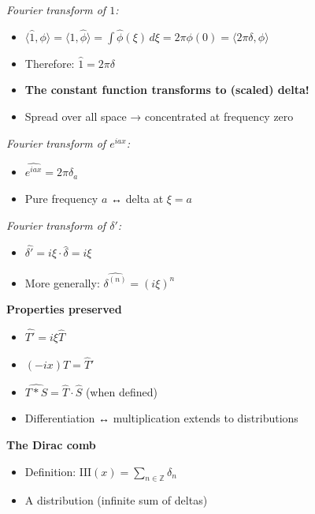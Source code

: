 \documentclass[
  10pt,
  letterpaper,
]{scrbook}
\providecommand{\tightlist}{%
  \setlength{\itemsep}{0pt}\setlength{\parskip}{0pt}}
\begin{document}
\emph{Fourier transform of \(1\):}

\begin{itemize}
\tightlist
\item
  \(\langle \hat{1}, \phi \rangle = \langle 1, \hat{\phi} \rangle = \int \hat{\phi}(\xi)\, d\xi = 2\pi \phi(0) = \langle 2\pi\delta, \phi \rangle\)
\item
  Therefore: \(\hat{1} = 2\pi\delta\)
\item
  \textbf{The constant function transforms to (scaled) delta!}
\item
  Spread over all space → concentrated at frequency zero
\end{itemize}

\emph{Fourier transform of \(e^{iax}\):}

\begin{itemize}
\tightlist
\item
  \(\widehat{e^{iax}} = 2\pi\delta_a\)
\item
  Pure frequency \(a\) ↔ delta at \(\xi = a\)
\end{itemize}

\emph{Fourier transform of \(\delta'\):}

\begin{itemize}
\tightlist
\item
  \(\widehat{\delta'} = i\xi \cdot \hat{\delta} = i\xi\)
\item
  More generally: \(\widehat{\delta^{(n)}} = (i\xi)^n\)
\end{itemize}

\textbf{Properties preserved}

\begin{itemize}
\tightlist
\item
  \(\widehat{T'} = i\xi \hat{T}\)
\item
  \(\widehat{(-ix)T} = \hat{T}'\)
\item
  \(\widehat{T * S} = \hat{T} \cdot \hat{S}\) (when defined)
\item
  Differentiation ↔ multiplication extends to distributions
\end{itemize}

\textbf{The Dirac comb}

\begin{itemize}
\tightlist
\item
  Definition: \(\text{III}(x) = \sum_{n \in \mathbb{Z}} \delta_n\)
\item
  A distribution (infinite sum of deltas)
\end{itemize}
\end{document}
